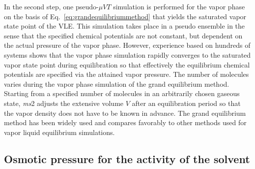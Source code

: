 In the second step, one pseudo-$\mu VT$ simulation \parencite{vrabec1} is performed for the vapor phase on the basis of Eq.~\eqref{eq:grandequilibriummethod} that yields the saturated vapor state point of the VLE. This simulation takes place in a pseudo ensemble in the sense that the specified chemical potentials are not constant, but dependent on the actual pressure of the vapor phase. However, experience based on hundreds of systems \parencite{huang,Vrabec2009} shows that the vapor phase simulation rapidly converges to the saturated vapor state point during equilibration so that effectively the equilibrium chemical potentials are specified via the attained vapor pressure. The number of molecules varies during the vapor phase simulation of the grand equilibrium method. Starting from a specified number of molecules in an arbitrarily chosen gaseous state, \textit{ms}2 adjusts the extensive volume $V$ after an equilibration period so that the vapor density does not have to be known in advance. The grand equilibrium method has been widely used and compares favorably to other methods used for vapor liquid equilibrium simulations.


\subsection{Osmotic pressure for the activity of the solvent}
\label{sec:osmotic pressure}


